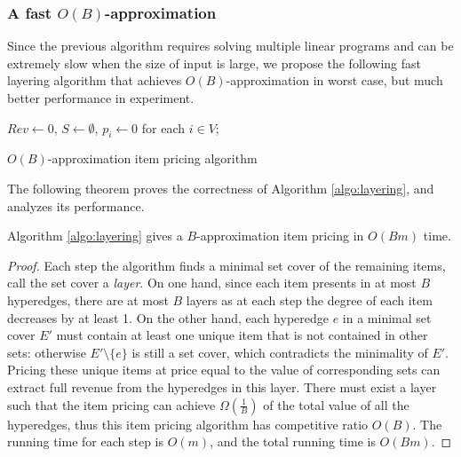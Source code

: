 \subsubsection{A fast $O(B)$-approximation}

Since the previous algorithm requires solving multiple linear programs and can be extremely slow when the size of input is large, we
propose the following fast layering algorithm that achieves $O(B)$-approximation in worst case, but much better performance in experiment.

\begin{algorithm}[!htp]
	\DontPrintSemicolon 
	\BlankLine
	$Rev \leftarrow 0$, $S\leftarrow \emptyset$, $p_i\leftarrow 0$ for each $i\in V$;\\
	\caption{$O(B)$-approximation item pricing algorithm}
	\label{algo:layering}
\end{algorithm}

The following theorem proves the correctness of Algorithm \ref{algo:layering}, and analyzes its performance.

\begin{theorem}
\label{thm-Bapprox}

Algorithm \ref{algo:layering} gives a $B$-approximation item pricing in $O(Bm)$ time. 

\end{theorem}

\begin{proof}
Each step the algorithm finds a minimal set cover of the remaining items, call the set cover a \textit{layer}.
On one hand, since each item presents in at most $B$ hyperedges, there are at most $B$ layers as at each step the degree of each item decreases by at least 1. On the other hand, each hyperedge $e$ in a minimal
set cover $E'$ must contain at least one unique item that is not contained in other sets: otherwise $E'\setminus \{e\}$ is still a set cover,
which contradicts the minimality of $E'$. Pricing these unique items at price equal to the value of corresponding sets can extract full revenue from the hyperedges in this layer. There must exist a layer such that the item pricing can achieve 
$\Omega(\frac{1}{B})$ of the total value of all the hyperedges, thus this item pricing algorithm has competitive ratio $O(B)$. The running time for each step is $O(m)$, and the total running time is $O(Bm)$.

\end{proof}
